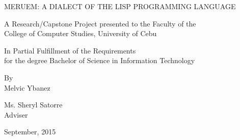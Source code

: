 \begin{titlepage}
	\begin{center}
		\vspace*{1cm}
		\large
		\uppercase{MERUEM: A dialect of the Lisp programming language}

		\vfill
		A Research/Capstone Project presented to the Faculty of the\\
		College of Computer Studies, University of Cebu
		
		\vfill
		In Partial Fulfillment of the Requirements\\
		for the degree Bachelor of Science in Information Technology
		
		\vfill
		By\\
		Melvic Ybanez
		
		\vfill
		Ms. Sheryl Satorre\\
		Adviser
		
		\vfill
		September, 2015
		
		\vspace*{1cm}
	\end{center}
\end{titlepage}